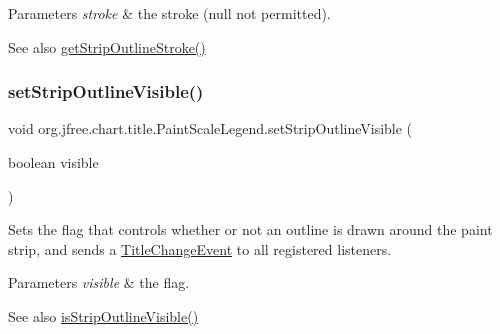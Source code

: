 \begin{DoxyParams}{Parameters}
{\em stroke} & the stroke ({\ttfamily null} not permitted).\\
\hline
\end{DoxyParams}
\begin{DoxySeeAlso}{See also}
\mbox{\hyperlink{classorg_1_1jfree_1_1chart_1_1title_1_1_paint_scale_legend_af735d5472f8cf21e1e07b7a1d5a5fe53}{get\+Strip\+Outline\+Stroke()}} 
\end{DoxySeeAlso}
\mbox{\label{classorg_1_1jfree_1_1chart_1_1title_1_1_paint_scale_legend_a573a98df421a6e4a200e0286a608be8c}} 
\subsubsection{\texorpdfstring{set\+Strip\+Outline\+Visible()}{setStripOutlineVisible()}}
{\footnotesize\ttfamily void org.\+jfree.\+chart.\+title.\+Paint\+Scale\+Legend.\+set\+Strip\+Outline\+Visible (\begin{DoxyParamCaption}\item[{boolean}]{visible }\end{DoxyParamCaption})}

Sets the flag that controls whether or not an outline is drawn around the paint strip, and sends a \mbox{\hyperlink{}{Title\+Change\+Event}} to all registered listeners.


\begin{DoxyParams}{Parameters}
{\em visible} & the flag.\\
\hline
\end{DoxyParams}
\begin{DoxySeeAlso}{See also}
\mbox{\hyperlink{classorg_1_1jfree_1_1chart_1_1title_1_1_paint_scale_legend_a5d129b2bb0ce2b552e36760a01ab1355}{is\+Strip\+Outline\+Visible()}} 
\end{DoxySeeAlso}
\mbox{\label{classorg_1_1jfree_1_1chart_1_1title_1_1_paint_scale_legend_a0b5b9e831a8f985969497cf9779beea4}} 
